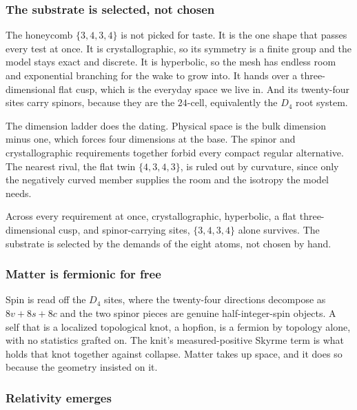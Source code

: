 \subsubsection{The substrate is selected, not chosen}

The honeycomb $\{3,4,3,4\}$ is not picked for taste. It is the one shape that passes every test at once. It is crystallographic, so its symmetry is a finite group and the model stays exact and discrete. It is hyperbolic, so the mesh has endless room and exponential branching for the wake to grow into. It hands over a three-dimensional flat cusp, which is the everyday space we live in. And its twenty-four sites carry spinors, because they are the $24$-cell, equivalently the $D_4$ root system.

The dimension ladder does the dating. Physical space is the bulk dimension minus one, which forces four dimensions at the base. The spinor and crystallographic requirements together forbid every compact regular alternative. The nearest rival, the flat twin $\{4,3,4,3\}$, is ruled out by curvature, since only the negatively curved member supplies the room and the isotropy the model needs.

\begin{result}
Across every requirement at once, crystallographic, hyperbolic, a flat three-dimensional cusp, and spinor-carrying sites, $\{3,4,3,4\}$ alone survives. The substrate is selected by the demands of the eight atoms, not chosen by hand.
\end{result}

\subsubsection{Matter is fermionic for free}

Spin is read off the $D_4$ sites, where the twenty-four directions decompose as $8v + 8s + 8c$ and the two spinor pieces are genuine half-integer-spin objects. A self that is a localized topological knot, a hopfion, is a fermion by topology alone, with no statistics grafted on. The knit's measured-positive Skyrme term is what holds that knot together against collapse. Matter takes up space, and it does so because the geometry insisted on it.

\subsubsection{Relativity emerges}

